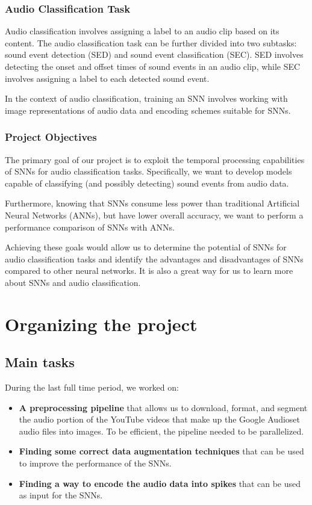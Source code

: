 \documentclass[11pt]{article}
\begin{document}
\subsubsection{Audio Classification Task}

Audio classification involves assigning a label to an audio clip based on its content. The audio classification task can be further divided into two subtasks: sound event detection (SED) and sound event classification (SEC). SED involves detecting the onset and offset times of sound events in an audio clip, while SEC involves assigning a label to each detected sound event.

In the context of audio classification, training an SNN involves working with image representations of audio data and encoding schemes suitable for SNNs.


\subsubsection{Project Objectives}

The primary goal of our project is to exploit the temporal processing capabilities of SNNs for audio classification tasks. Specifically, we want to develop models capable of classifying (and possibly detecting) sound events from audio data.

Furthermore, knowing that SNNs consume less power than traditional Artificial Neural Networks (ANNs), but have lower overall accuracy, we want to perform a performance comparison of SNNs with ANNs.

Achieving these goals would allow us to determine the potential of SNNs for audio classification tasks and identify the advantages and disadvantages of SNNs compared to other neural networks. It is also a great way for us to learn more about SNNs and audio classification.

\section{Organizing the project}

\subsection{Main tasks}

During the last full time period, we worked on:

\begin{itemize}
  \item \textbf{A preprocessing pipeline} that allows us to download, format, and segment the audio portion of the YouTube videos that make up the Google Audioset audio files into images.
        To be efficient, the pipeline needed to be parallelized.
  \item \textbf{Finding some correct data augmentation techniques} that can be used to improve the performance of the SNNs.
  \item \textbf{Finding a way to encode the audio data into spikes} that can be used as input for the SNNs.
\end{itemize}
\end{document}
